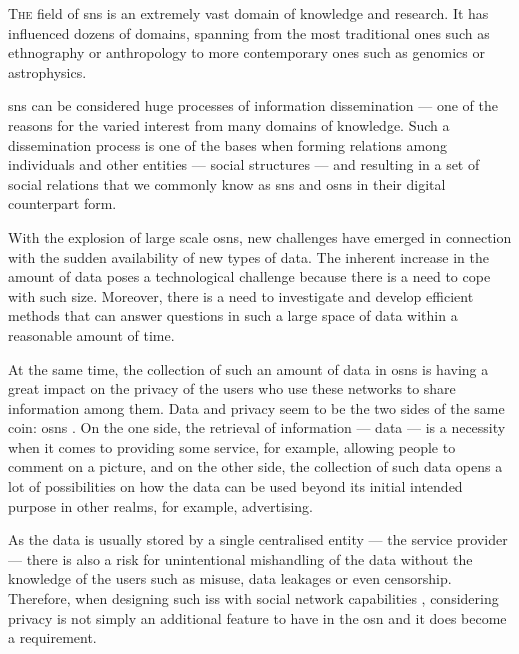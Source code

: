 

\lettrine{\textcolor[gray]{.25}{T}}{he} field of \acp{sn} is an extremely vast domain 
of knowledge and research. It has influenced dozens of domains, spanning from the 
most traditional ones such as ethnography or anthropology to more contemporary ones 
such as genomics or astrophysics.

\Acp{sn} can be considered huge processes of information dissemination --- one of 
the reasons for the varied interest from many domains of knowledge. Such a dissemination 
process is one of the bases when forming relations among individuals and other entities 
--- social structures --- and resulting in a set of social relations that we commonly 
know as \acp{sn} and \acp{osn} in their digital counterpart form.

With the explosion of large scale \acp{osn}, new challenges have emerged in connection 
with the sudden availability of new types of data. The inherent increase in the 
amount of data poses a technological challenge because there is a need to cope with 
such size. Moreover, there is a need to investigate and develop efficient methods 
that can answer questions in such a large space of data within a reasonable amount 
of time.

At the same time, the collection of such an amount of data in \acp{osn} is having 
a great impact on the privacy of the users who use these networks to share information 
among them. Data and privacy seem to be the two sides of the same coin: \acp{osn} 
\cite{BelkinC92}. On the one side, the retrieval of information --- data --- is 
a necessity when it comes to providing some service, for example, allowing people 
to comment on a picture, and on the other side, the collection of such data opens 
a lot of possibilities on how the data can be used beyond its initial intended purpose 
in other realms, for example, advertising.

As the data is usually stored by a single centralised entity --- the service provider --- 
there is also a risk for unintentional mishandling of the data without the knowledge 
of the users such as misuse, data leakages or even censorship. Therefore, when designing 
such \acp{is} with social network capabilities \cite{Abrams06, Lunt06, Lunt07, Zhu08, Lunt09}, 
considering privacy is not simply an additional feature to have in the \ac{osn} 
and it does become a requirement. 

